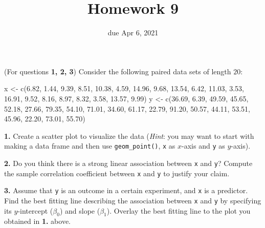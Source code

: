 \documentclass[
]{article}
\title{Homework 9}
\subtitle{due Apr 6, 2021}
\author{}
\date{\vspace{-2.5em}}
\newenvironment{Shaded}{\begin{snugshade}}{\end{snugshade}}
\newcommand{\FloatTok}[1]{\textcolor[rgb]{0.00,0.00,0.81}{#1}}
\newcommand{\FunctionTok}[1]{\textcolor[rgb]{0.00,0.00,0.00}{#1}}
\newcommand{\NormalTok}[1]{#1}
\newcommand{\OtherTok}[1]{\textcolor[rgb]{0.56,0.35,0.01}{#1}}
\begin{document}
\maketitle

(For questions \textbf{1, 2, 3}) Consider the following paired data sets
of length \(20\):

\begin{Shaded}
\begin{Highlighting}[]
\NormalTok{x }\OtherTok{\textless{}{-}} \FunctionTok{c}\NormalTok{(}\FloatTok{6.82}\NormalTok{, }\FloatTok{1.44}\NormalTok{, }\FloatTok{9.39}\NormalTok{,  }\FloatTok{8.51}\NormalTok{, }\FloatTok{10.38}\NormalTok{,  }\FloatTok{4.59}\NormalTok{, }\FloatTok{14.96}\NormalTok{,  }\FloatTok{9.68}\NormalTok{, }\FloatTok{13.54}\NormalTok{,  }\FloatTok{6.42}\NormalTok{, }\FloatTok{11.03}\NormalTok{,  }
       \FloatTok{3.53}\NormalTok{, }\FloatTok{16.91}\NormalTok{,  }\FloatTok{9.52}\NormalTok{,  }\FloatTok{8.16}\NormalTok{,  }\FloatTok{8.97}\NormalTok{,  }\FloatTok{8.32}\NormalTok{,  }\FloatTok{3.58}\NormalTok{, }\FloatTok{13.57}\NormalTok{,  }\FloatTok{9.99}\NormalTok{)}
\NormalTok{y }\OtherTok{\textless{}{-}} \FunctionTok{c}\NormalTok{(}\FloatTok{36.69}\NormalTok{, }\FloatTok{6.39}\NormalTok{, }\FloatTok{49.59}\NormalTok{, }\FloatTok{45.65}\NormalTok{, }\FloatTok{52.18}\NormalTok{, }\FloatTok{27.66}\NormalTok{, }\FloatTok{79.35}\NormalTok{, }\FloatTok{54.10}\NormalTok{, }\FloatTok{71.01}\NormalTok{, }\FloatTok{34.60}\NormalTok{, }\FloatTok{61.17}\NormalTok{, }
       \FloatTok{22.79}\NormalTok{, }\FloatTok{91.20}\NormalTok{, }\FloatTok{50.57}\NormalTok{, }\FloatTok{44.11}\NormalTok{, }\FloatTok{53.51}\NormalTok{, }\FloatTok{45.96}\NormalTok{, }\FloatTok{22.20}\NormalTok{, }\FloatTok{73.01}\NormalTok{, }\FloatTok{55.70}\NormalTok{)}
\end{Highlighting}
\end{Shaded}

\textbf{1.} Create a scatter plot to visualize the data (\emph{Hint}:
you may want to start with making a data frame and then use
\texttt{geom\_point()}, \texttt{x} as \(x\)-axis and \texttt{y} as
\(y\)-axis).

\textbf{2.} Do you think there is a strong linear association between
\texttt{x} and \texttt{y}? Compute the sample correlation coefficient
between \texttt{x} and \texttt{y} to justify your claim.

\textbf{3.} Assume that \texttt{y} is an outcome in a certain
experiment, and \texttt{x} is a predictor. Find the best fitting line
describing the association between \texttt{x} and \texttt{y} by
specifying its \(y\)-intercept (\(\beta_0\)) and slope (\(\beta_1\)).
Overlay the best fitting line to the plot you obtained in \textbf{1.}
above.
\end{document}
